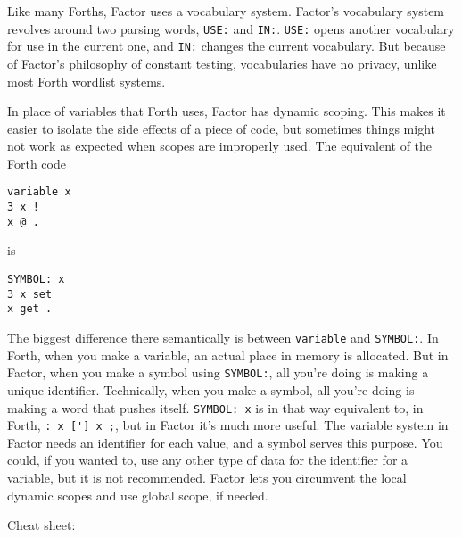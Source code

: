 \documentclass{article}
\begin{document}
Like many Forths, Factor uses a vocabulary system. Factor's vocabulary system revolves around two parsing words, \texttt{USE:} and \texttt{IN:}. \texttt{USE:} opens another vocabulary for use in the current one, and \texttt{IN:} changes the current vocabulary. But because of Factor's philosophy of constant testing, vocabularies have no privacy, unlike most Forth wordlist systems.

In place of variables that Forth uses, Factor has dynamic scoping. This makes it easier to isolate the side effects of a piece of code, but sometimes things might not work as expected when scopes are improperly used. The equivalent of the Forth code
\begin{verbatim}
variable x
3 x !
x @ .
\end{verbatim}
is
\begin{verbatim}
SYMBOL: x
3 x set
x get .
\end{verbatim}
The biggest difference there semantically is between \texttt{variable} and \texttt{SYMBOL:}. In Forth, when you make a variable, an actual place in memory is allocated. But in Factor, when you make a symbol using \texttt{SYMBOL:}, all you're doing is making a unique identifier. Technically, when you make a symbol, all you're doing is making a word that pushes itself. \verb|SYMBOL: x| is in that way equivalent to, in Forth, \verb|: x ['] x ;|, but in Factor it's much more useful. The variable system in Factor needs an identifier for each value, and a symbol serves this purpose. You could, if you wanted to, use any other type of data for the identifier for a variable, but it is not recommended. Factor lets you circumvent the local dynamic scopes and use global scope, if needed.

Cheat sheet:
\end{document}
